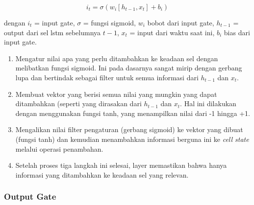 \documentclass[./skripsi.tex]{subfiles}
\begin{document}
\begin{equation}
    i_t = \sigma (w_i[h_{t-1},x_t] + b_i)
    \label{eq:lstm_input_gate}
\end{equation}
\par dengan $i_t$ = input gate, $\sigma$ = fungsi sigmoid, $w_i$ bobot dari input gate, $h_{t-1}$ = output dari sel lstm sebelumnya $t-1$, $x_t$ = input dari waktu saat ini, $b_i$ bias dari input gate.

\begin{enumerate}
    \item Mengatur nilai apa yang perlu ditambahkan ke keadaan sel dengan melibatkan fungsi sigmoid. Ini pada dasarnya sangat mirip dengan gerbang lupa dan bertindak sebagai filter untuk semua informasi dari $h_{t-1}$ dan $x_{t}$.
    \item Membuat vektor yang berisi semua nilai yang mungkin yang dapat ditambahkan (seperti yang dirasakan dari $h_{t-1}$ dan $x_t$. Hal ini dilakukan dengan menggunakan fungsi tanh, yang menampilkan nilai dari -1 hingga +1.
    \item Mengalikan nilai filter pengaturan (gerbang sigmoid) ke vektor yang dibuat (fungsi tanh) dan kemudian menambahkan informasi berguna ini ke \textit{cell state} melalui operasi penambahan.
    \item Setelah proses tiga langkah ini selesai, layer memastikan bahwa hanya informasi yang ditambahkan ke keadaan sel yang relevan.
\end{enumerate}
\subsubsection{Output Gate}\label{bab2:lstmoutputgate}
\end{document}
